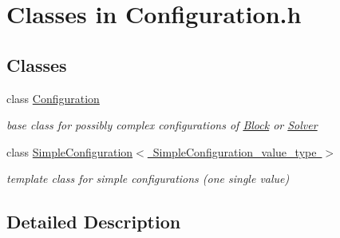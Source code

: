 \hypertarget{group___configuration___c_l_a_s_s_e_s}{}\section{Classes in Configuration.\+h}
\label{group___configuration___c_l_a_s_s_e_s}
\subsection*{Classes}
\begin{DoxyCompactItemize}
\item 
class \mbox{\hyperlink{class_s_m_spp__di__unipi__it_1_1_configuration}{Configuration}}
\begin{DoxyCompactList}\small\item\em base class for possibly complex configurations of \mbox{\hyperlink{class_s_m_spp__di__unipi__it_1_1_block}{Block}} or \mbox{\hyperlink{class_s_m_spp__di__unipi__it_1_1_solver}{Solver}} \end{DoxyCompactList}\item 
class \mbox{\hyperlink{class_s_m_spp__di__unipi__it_1_1_simple_configuration}{Simple\+Configuration$<$ Simple\+Configuration\+\_\+value\+\_\+type $>$}}
\begin{DoxyCompactList}\small\item\em template class for simple configurations (one single value) \end{DoxyCompactList}\end{DoxyCompactItemize}


\subsection{Detailed Description}

